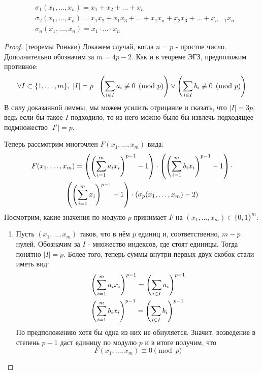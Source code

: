\begin{example}
	\begin{align*}
		&{\sigma_1(x_1, \ldots, x_n) = x_1 + x_2 + \ldots + x_n}
		\\
		&{\sigma_2(x_1, \ldots, x_n) = x_1x_2 + x_1x_3 + \ldots + x_1x_n + x_2x_3 + \ldots + x_{n - 1}x_n}
		\\
		&{\sigma_n(x_1, \ldots, x_n) = x_1 \cdot \ldots \cdot x_n}
	\end{align*}
\end{example}

\begin{proof} (теоремы Роньяи)
	Докажем случай, когда $n = p$ - простое число. Дополнительно обозначим за $m = 4p - 2$. Как и в теореме ЭГЗ, предположим противное:
	\[
	\forall I \subset \{1, \ldots, m\},\ |I| = p\ \ \left(\suml_{i \in I} a_i \not\equiv 0 \pmod p\right) \vee \left(\suml_{i \in I} b_i \not\equiv 0 \pmod p\right)
	\]
	В силу доказанной леммы, мы можем усилить отрицание и сказать, что $|I| = 3p$, ведь если бы такое $I$ подходило, то из него можно было бы извлечь подходящее подмножество $|I'| = p$.
	
	Теперь рассмотрим многочлен $F(x_1, \ldots, x_m)$ вида:
	\begin{multline*}
		F(x_1, \ldots, x_m) = \left(\left(\sum\limits_{i = 1}^m a_ix_i\right)^{p - 1} - 1\right) \cdot \left(\left(\sum\limits_{i = 1}^m b_ix_i\right)^{p - 1} - 1\right) \cdot
		\\
		\left(\left(\sum\limits_{i = 1}^m x_i\right)^{p - 1} - 1\right) \cdot \left(\sigma_p(x_1, \ldots, x_m) - 2\right)
	\end{multline*}
	Посмотрим, какие значения по модулю $p$ принимает $F$ на $(x_1, \ldots, x_m) \in \{0, 1\}^m$:
	\begin{enumerate}
		\item Пусть $(x_1, \ldots, x_m)$ таков, что в нём $p$ единиц и, соответственно, $m - p$ нулей. Обозначим за $I$ - множество индексов, где стоят единицы. Тогда понятно $|I| = p$. Более того, теперь суммы внутри первых двух скобок стали иметь вид:
		\begin{align*}
			&{\left(\sum\limits_{i = 1}^m a_ix_i\right)^{p - 1} = \left(\sum\limits_{i \in I} a_i\right)^{p - 1}}
			\\
			&{\left(\sum\limits_{i = 1}^m b_ix_i\right)^{p - 1} = \left(\sum\limits_{i \in I} b_i\right)^{p - 1}}
		\end{align*}
		По предположению хотя бы одна из них не обнуляется. Значит, возведение в степень $p - 1$ даст единицу по модулю $p$ и в итоге получим, что
		\[
			F(x_1, \ldots, x_m) \equiv 0 \pmod p
		\]
		

\end{enumerate}
\end{proof}
